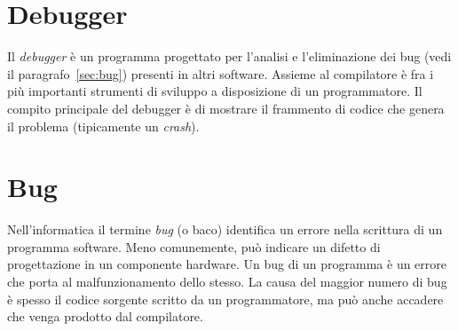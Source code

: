 	\section{Debugger}
Il \emph{debugger} è un programma progettato per l'analisi e l'eliminazione dei bug (vedi il paragrafo~\vref{sec:bug}) presenti in altri software. Assieme al compilatore è fra i più importanti strumenti di sviluppo a disposizione di un programmatore. Il compito principale del debugger è di mostrare il frammento di codice che genera il problema (tipicamente un \emph{crash}).

	\section{Bug}
	\label{sec:bug}
Nell'informatica il termine \emph{bug} (o baco) identifica un errore nella scrittura di un programma software. Meno comunemente, può indicare un difetto di progettazione in un componente hardware. Un bug di un programma è un errore che porta al malfunzionamento dello stesso. La causa del maggior numero di bug è spesso il codice sorgente scritto da un programmatore, ma può anche accadere che venga prodotto dal compilatore.
